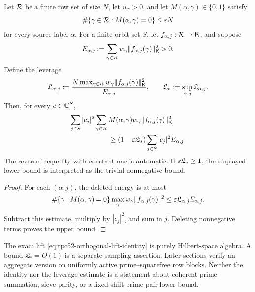 \begin{proposition}
\label{prop:tpc52-mask-leverage}
Let \(\mathcal R\) be a finite row set of size \(N\), let \(w_\gamma>0\), and
let \(M(\alpha,\gamma)\in\{0,1\}\) satisfy
\begin{equation}
 \#\{\gamma\in\mathcal R:M(\alpha,\gamma)=0\}\leq\varepsilon N
 \label{eq:tpc52-leverage-mask-degree}
\end{equation}
for every source label \(\alpha\).  For a finite orbit set \(S\), let
\(f_{\alpha,j}:\mathcal R\to\mathsf K\), and suppose
\begin{equation}
 E_{\alpha,j}
 :=\sum_{\gamma\in\mathcal R}w_\gamma
        \|f_{\alpha,j}(\gamma)\|_{\mathsf K}^2>0.
 \label{eq:tpc52-component-row-energy}
\end{equation}
Define the leverage
\begin{equation}
 \mathfrak L_{\alpha,j}
 :=\frac{N\max_{\gamma\in\mathcal R}
       w_\gamma\|f_{\alpha,j}(\gamma)\|_{\mathsf K}^2}
       {E_{\alpha,j}},
 \qquad
 \mathfrak L_*:=\sup_{\alpha,j}\mathfrak L_{\alpha,j}.
 \label{eq:tpc52-mask-leverage}
\end{equation}
Then, for every \(c\in\mathbb C^S\),
\begin{align}
 &\sum_{j\in S}|c_j|^2
   \sum_{\gamma\in\cR}M(\alpha,\gamma)w_\gamma
       \|f_{\alpha,j}(\gamma)\|_{\mathsf K}^2
 \notag\\
 &\hspace{20mm}\geq
 (1-\eps\mathfrak L_*)
 \sum_{j\in S}|c_j|^2E_{\alpha,j}.
 \label{eq:tpc52-masked-orthogonal-lower-bound}
\end{align}
The reverse inequality with constant one is automatic.  If
\(\varepsilon\mathfrak L_*\geq1\), the displayed lower bound is interpreted
as the trivial nonnegative bound.
\end{proposition}

\begin{proof}
For each \((\alpha,j)\), the deleted energy is at most
\begin{align}
 \#\{\gamma:M(\alpha,\gamma)=0\}
 \max_\gamma w_\gamma\|f_{\alpha,j}(\gamma)\|^2
 \leq\varepsilon\mathfrak L_{\alpha,j}E_{\alpha,j}.
 \label{eq:tpc52-leverage-deletion-proof}
\end{align}
Subtract this estimate, multiply by \(|c_j|^2\), and sum in \(j\).
Deleting nonnegative terms proves the upper bound.
\end{proof}

\begin{remark}
\label{rem:tpc52-leverage-scope}
The exact lift \eqref{eq:tpc52-orthogonal-lift-identity} is purely
Hilbert-space algebra.  A bound \(\mathfrak L_*=O(1)\) is a separate
sampling assertion.  Later sections verify an aggregate version on
uniformly active prime--squarefree row blocks.  Neither the identity nor
the leverage estimate is a statement about coherent prime summation,
sieve parity, or a fixed-shift prime-pair lower bound.
\end{remark}
